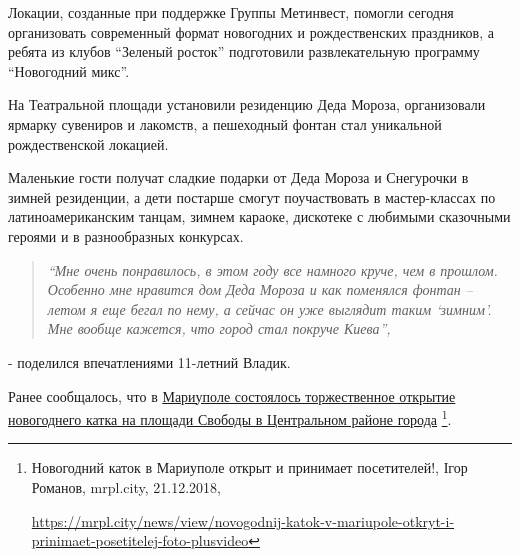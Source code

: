 Локации, созданные при поддержке Группы Метинвест, помогли сегодня организовать
современный формат новогодних и рождественских праздников, а ребята из клубов
\enquote{Зеленый росток} подготовили развлекательную программу \enquote{Новогодний микс}.

На Театральной площади установили резиденцию Деда Мороза, организовали ярмарку
сувениров и лакомств, а пешеходный фонтан стал уникальной рождественской
локацией. 

Маленькие гости получат сладкие подарки от Деда Мороза и Снегурочки в зимней
резиденции, а дети постарше смогут поучаствовать в мастер-классах по
латиноамериканским танцам, зимнем караоке, дискотеке с любимыми сказочными
героями и в разнообразных конкурсах.

\begin{quote}
\em\enquote{Мне очень понравилось, в этом году все намного круче, чем в прошлом. Особенно
мне нравится дом Деда Мороза и как поменялся фонтан – летом я еще бегал по
нему, а сейчас он уже выглядит таким \enquote{зимним}. Мне вообще кажется, что город
стал покруче Киева}, 
\end{quote}
- поделился впечатлениями 11-летний Владик.

Ранее сообщалось, что в \href{https://mrpl.city/news/view/novogodnij-katok-v-mariupole-otkryt-i-prinimaet-posetitelej-foto-plusvideo}{%
Мариуполе состоялось торжественное открытие новогоднего катка на площади Свободы в Центральном районе города}%
\footnote{Новогодний каток в Мариуполе открыт и принимает посетителей!, Ігор Романов, %
mrpl.city, 21.12.2018, \par%
\url{https://mrpl.city/news/view/novogodnij-katok-v-mariupole-otkryt-i-prinimaet-posetitelej-foto-plusvideo}
}.
